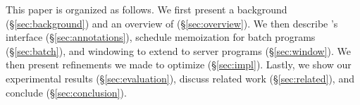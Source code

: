 This paper is organized as follows.  We first present a background
(\S\ref{sec:background}) and an overview of \tern (\S\ref{sec:overview}).
We then describe \tern's interface (\S\ref{sec:annotations}), schedule
memoization for batch programs (\S\ref{sec:batch}), and windowing to
extend \tern to server programs (\S\ref{sec:window}).  We then present 
refinements we made to optimize \tern (\S\ref{sec:impl}).  Lastly, we show
our experimental results (\S\ref{sec:evaluation}), discuss related work
(\S\ref{sec:related}), and conclude (\S\ref{sec:conclusion}).










